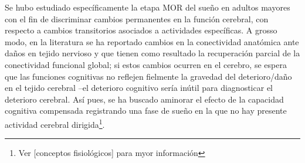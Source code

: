 Se hubo estudiado espec\'ificamente la etapa MOR del sue\~no en adultos mayores
con el fin de discriminar
cambios permanentes en la funci\'on cerebral, con respecto a cambios transitorios asociados
a actividades espec\'ificas.
A grosso modo, en la literatura se ha reportado cambios en la conectividad anat\'omica
ante da\~nos en tejido nervioso y que tienen como resultado la recuperaci\'on parcial
de la conectividad funcional global; si estos cambios ocurren en el cerebro, se espera que las
funciones cognitivas no reflejen fielmente la gravedad del deterioro/da\~no en el tejido cerebral
--el deterioro cognitivo ser\'ia in\'util para diagnosticar el deterioro cerebral.
As\'i pues, se ha buscado aminorar el efecto de la capacidad cognitiva compensada
registrando una fase de sue\~no en la que no hay presente actividad cerebral 
dirigida\footnote{Ver [conceptos fisiol\'ogicos] para myor informaci\'on}.


